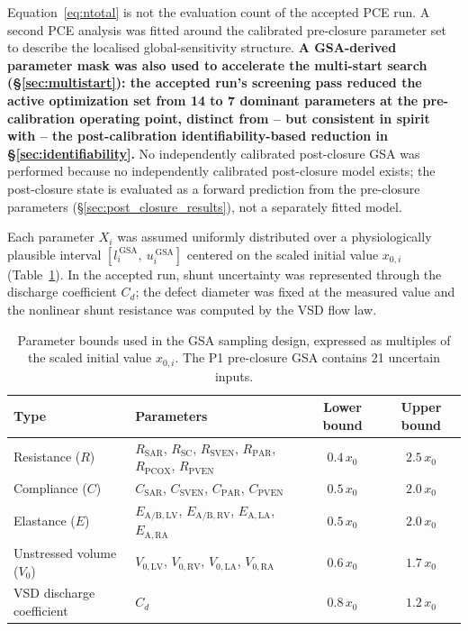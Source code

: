 \documentclass{article}
\begin{document}
Equation~\eqref{eq:ntotal} is not the evaluation count of the accepted PCE run.
A second PCE analysis was fitted around the calibrated pre-closure parameter set
to describe the localised global-sensitivity structure. \textbf{A GSA-derived
parameter mask was also used to accelerate the multi-start search
(\S\ref{sec:multistart}): the accepted run's screening pass reduced the active
optimization set from 14 to 7 dominant parameters at the pre-calibration
operating point, distinct from -- but consistent in spirit with -- the
post-calibration identifiability-based reduction in \S\ref{sec:identifiability}.}
No independently calibrated post-closure GSA was performed because no
independently calibrated post-closure model exists; the post-closure state is
evaluated as a forward prediction from the pre-closure parameters (\S\ref{sec:post_closure_results}), not a separately fitted model.

Each parameter $X_i$ was assumed uniformly distributed over a
physiologically plausible interval $[l_i^{\,\mathrm{GSA}},\
u_i^{\,\mathrm{GSA}}]$ centered on the scaled initial value
$x_{0,i}$ (Table~\ref{tab:gsa_bounds}). In the accepted run, shunt uncertainty
was represented through the discharge coefficient $C_d$; the defect diameter
was fixed at the measured value and the nonlinear shunt resistance was computed
by the VSD flow law.

\begin{table}[ht]
\centering
\caption{Parameter bounds used in the GSA sampling design,
         expressed as multiples of the scaled initial value
         $x_{0,i}$. The P1 pre-closure GSA contains 21 uncertain inputs.}
\label{tab:gsa_bounds}
\begin{tabularx}{\linewidth}{>{\raggedright\arraybackslash}X >{\raggedright\arraybackslash}X cc}
\toprule
\textbf{Type} & \textbf{Parameters} & \textbf{Lower bound} & \textbf{Upper bound} \\
\midrule
Resistance ($R$)       & $R_\mathrm{SAR}$, $R_\mathrm{SC}$, $R_\mathrm{SVEN}$,
                          $R_\mathrm{PAR}$, $R_\mathrm{PCOX}$, $R_\mathrm{PVEN}$
                        & $0.4\,x_0$ & $2.5\,x_0$ \\
Compliance ($C$)       & $C_\mathrm{SAR}$, $C_\mathrm{SVEN}$,
                          $C_\mathrm{PAR}$, $C_\mathrm{PVEN}$
                        & $0.5\,x_0$ & $2.0\,x_0$ \\
Elastance ($E$)        & $E_{\mathrm{A/B},\mathrm{LV}}$,
                          $E_{\mathrm{A/B},\mathrm{RV}}$, $E_{\mathrm{A},\mathrm{LA}}$,
                          $E_{\mathrm{A},\mathrm{RA}}$
                        & $0.5\,x_0$ & $2.0\,x_0$ \\
Unstressed volume ($V_0$) & $V_{0,\mathrm{LV}}$, $V_{0,\mathrm{RV}}$,
                             $V_{0,\mathrm{LA}}$, $V_{0,\mathrm{RA}}$
                           & $0.6\,x_0$ & $1.7\,x_0$ \\
VSD discharge coefficient & $C_d$
                           & $0.8\,x_0$ & $1.2\,x_0$ \\
\bottomrule
\end{tabularx}
\end{table}
\end{document}
